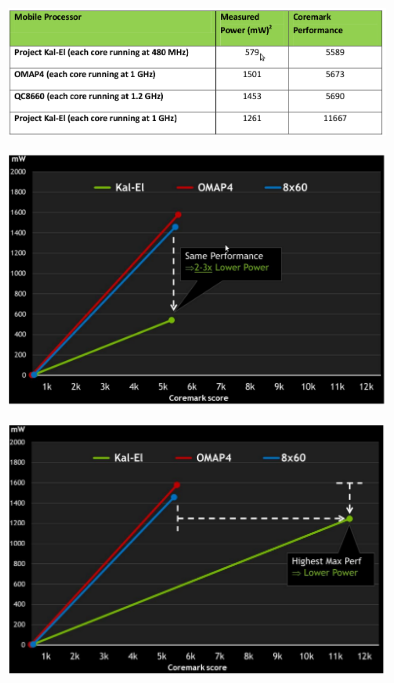 \documentclass{beamer}
\begin{document}
\begin{frame}
  \begin{figure}
    \centering
    \includegraphics[width=10.0cm]{./pictures/Table1}
  \end{figure}
\end{frame}

\begin{frame}
  \begin{figure}
    \centering
    \includegraphics[width=10.0cm]{./pictures/Kal-ElLowerFrequency}
  \end{figure}
\end{frame}

\begin{frame}
  \begin{figure}
    \centering
    \includegraphics[width=10.0cm]{./pictures/Kal-ElHigherFrequency}
  \end{figure}
\end{frame}
\end{document}
